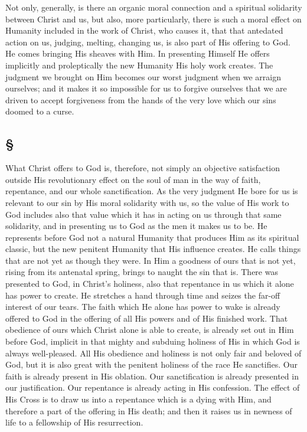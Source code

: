 \documentclass[draft]{ptfdoc}
\begin{document}
Not only, generally, is there an organic moral 
connection and a spiritual solidarity between 
Christ and us, but also, more particularly, there 
is such a moral effect on Humanity included in 
the work of Christ, who causes it, that that antedated 
action on us, judging, melting, changing 
us, is also part of His offering to God. He comes 
bringing His sheaves with Him. In presenting 
Himself He offers implicitly and proleptically 
the new Humanity His holy work creates. The 
judgment we brought on Him becomes our 
worst judgment when we arraign ourselves; 
and it makes it so impossible for us to forgive 
ourselves that we are driven to accept forgiveness 
from the hands of the very love which 
our sins doomed to a curse. 

\subsection*{
\S
}

What Christ offers to God is, therefore, not 
simply an objective satisfaction outside His 
revolutionary effect on the soul of man in the 
way of faith, repentance, and our whole sanctification. 
As the very judgment He bore for 
us is relevant to our sin by His moral solidarity 
with us, so the value of His work to God includes 
also that value which it has in acting 
on us through that same solidarity, and in presenting 
us to God as the men it makes us to be. 
He represents before God not a natural Humanity 
that produces Him as its spiritual classic, but 
the new penitent Humanity that His influence 
creates. He calls things that are not yet as 
though they were. In Him a goodness of ours 
that is not yet, rising from its antenatal spring, 
brings to naught the sin that is. There was 
presented to God, in Christ's holiness, also that 
repentance in us which it alone has power to 
create. He stretches a hand through time and 
seizes the far-off interest of our tears. The 
faith which He alone has power to wake is 
already offered to God in the offering of 
all His powers and of His finished work. 
That obedience of ours which Christ alone 
is able to create, is already set out in Him 
before God, implicit in that mighty and subduing 
holiness of His in which God is always 
well-pleased. All His obedience and holiness 
is not only fair and beloved of God, but it is 
also great with the penitent holiness of the race 
He sanctifies. Our faith is already present in His 
oblation. Our sanctification is already presented 
in our justification. Our repentance is already 
acting in His confession. The effect of His 
Cross is to draw us into a repentance which 
is a dying with Him, and therefore a part of 
the offering in His death; and then it raises 
us in newness of life to a fellowship of His 
resurrection. 
\end{document}
